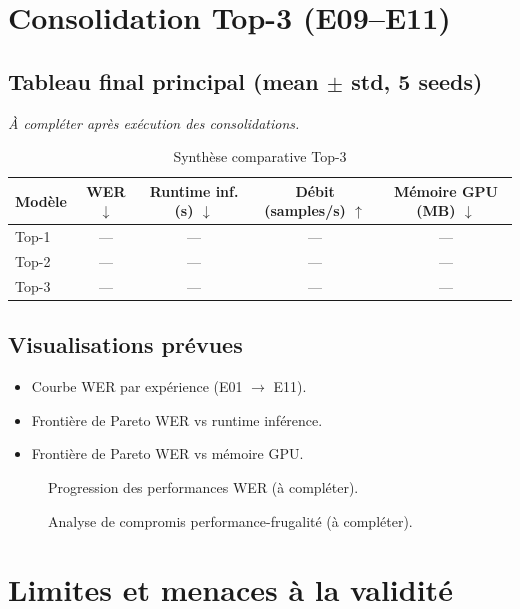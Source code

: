 \documentclass[11pt,a4paper]{article}
\begin{document}
\section{Consolidation Top-3 (E09--E11)}
\subsection{Tableau final principal (mean $\pm$ std, 5 seeds)}
\textit{À compléter après exécution des consolidations.}

\begin{table}[H]
\centering
\caption{Synthèse comparative Top-3}
\begin{tabular}{lcccc}
\toprule
Modèle & WER $\downarrow$ & Runtime inf. (s) $\downarrow$ & Débit (samples/s) $\uparrow$ & Mémoire GPU (MB) $\downarrow$ \\
\midrule
Top-1 & --- & --- & --- & --- \\
Top-2 & --- & --- & --- & --- \\
Top-3 & --- & --- & --- & --- \\
\bottomrule
\end{tabular}
\end{table}

\subsection{Visualisations prévues}
\begin{itemize}
\item Courbe WER par expérience (E01 $\rightarrow$ E11).
\item Frontière de Pareto WER vs runtime inférence.
\item Frontière de Pareto WER vs mémoire GPU.
\end{itemize}

\begin{figure}[H]
\centering
{}
\caption{Progression des performances WER (à compléter).}
\end{figure}

\begin{figure}[H]
\centering
{}
\caption{Analyse de compromis performance-frugalité (à compléter).}
\end{figure}


\section{Limites et menaces à la validité}
\end{document}

